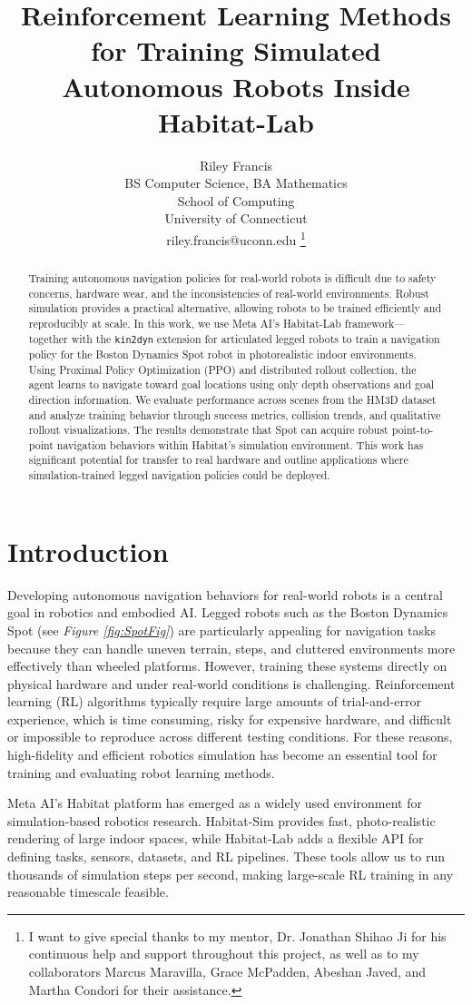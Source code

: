 \documentclass{article} %
\title{Reinforcement Learning Methods for Training Simulated Autonomous Robots Inside Habitat-Lab}
\author{
Riley Francis \\
BS Computer Science, BA Mathematics \\
School of Computing \\
University of Connecticut \\
riley.francis@uconn.edu
\thanks{I want to give special thanks to my mentor, Dr. Jonathan Shihao Ji for his continuous help and support throughout this project, as well as to my collaborators Marcus Maravilla, Grace McPadden, Abeshan Javed, and Martha Condori for their assistance.}
}
\begin{document}
\maketitle
\begin{abstract}
Training autonomous navigation policies for real-world robots is difficult due to safety concerns, hardware wear, and the inconsistencies of real-world environments. Robust simulation provides a practical alternative, allowing robots to be trained efficiently and reproducibly at scale. In this work, we use Meta AI’s Habitat-Lab framework—together with the \texttt{kin2dyn} extension for articulated legged robots to train a navigation policy for the Boston Dynamics Spot robot in photorealistic indoor environments. Using Proximal Policy Optimization (PPO) and distributed rollout collection, the agent learns to navigate toward goal locations using only depth observations and goal direction information. We evaluate performance across scenes from the HM3D dataset and analyze training behavior through success metrics, collision trends, and qualitative rollout visualizations. The results demonstrate that Spot can acquire robust point-to-point navigation behaviors within Habitat’s simulation environment. This work has significant potential for transfer to real hardware and outline applications where simulation-trained legged navigation policies could be deployed.
\end{abstract}

\section{Introduction}
Developing autonomous navigation behaviors for real-world robots is a central goal in robotics and embodied AI. Legged robots such as the Boston Dynamics Spot (see \textit{Figure \ref{fig:SpotFig}}) are particularly appealing for navigation tasks because they can handle uneven terrain, steps, and cluttered environments more effectively than wheeled platforms. However, training these systems directly on physical hardware and under real-world conditions is challenging. Reinforcement learning (RL) algorithms typically require large amounts of trial-and-error experience, which is time consuming, risky for expensive hardware, and difficult or impossible to reproduce across different testing conditions. For these reasons, high-fidelity and efficient robotics simulation has become an essential tool for training and evaluating robot learning methods. 

Meta AI’s Habitat platform has emerged as a widely used environment for simulation-based robotics research. Habitat-Sim provides fast, photo-realistic rendering of large indoor spaces, while Habitat-Lab adds a flexible API for defining tasks, sensors, datasets, and RL pipelines. These tools allow us to run thousands of simulation steps per second, making large-scale RL training in any reasonable timescale feasible.
\end{document}

